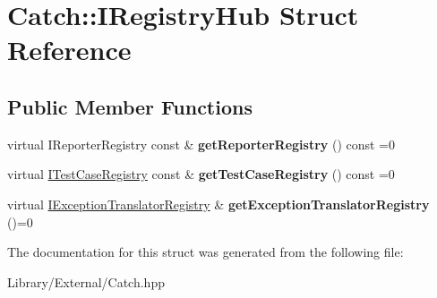 \hypertarget{struct_catch_1_1_i_registry_hub}{}\section{Catch\+:\+:I\+Registry\+Hub Struct Reference}
\label{struct_catch_1_1_i_registry_hub}
\subsection*{Public Member Functions}
\begin{DoxyCompactItemize}
\item 
\hypertarget{struct_catch_1_1_i_registry_hub_a55534563f7ecf7e20ec1e37285ebe54d}{}virtual I\+Reporter\+Registry const \& {\bfseries get\+Reporter\+Registry} () const =0\label{struct_catch_1_1_i_registry_hub_a55534563f7ecf7e20ec1e37285ebe54d}

\item 
\hypertarget{struct_catch_1_1_i_registry_hub_af4f6255f0c0f8f1f179fa9d7d4843076}{}virtual \hyperlink{struct_catch_1_1_i_test_case_registry}{I\+Test\+Case\+Registry} const \& {\bfseries get\+Test\+Case\+Registry} () const =0\label{struct_catch_1_1_i_registry_hub_af4f6255f0c0f8f1f179fa9d7d4843076}

\item 
\hypertarget{struct_catch_1_1_i_registry_hub_a3606988da110c016c5af3ae63454eb78}{}virtual \hyperlink{struct_catch_1_1_i_exception_translator_registry}{I\+Exception\+Translator\+Registry} \& {\bfseries get\+Exception\+Translator\+Registry} ()=0\label{struct_catch_1_1_i_registry_hub_a3606988da110c016c5af3ae63454eb78}

\end{DoxyCompactItemize}


The documentation for this struct was generated from the following file\+:\begin{DoxyCompactItemize}
\item 
Library/\+External/Catch.\+hpp\end{DoxyCompactItemize}
